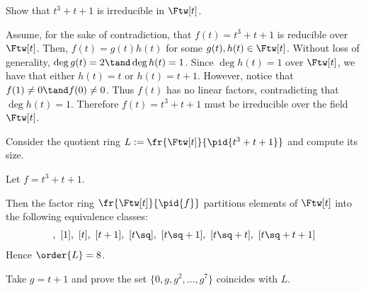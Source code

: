 \documentclass{article}
\begin{document}

\setcounter{section}{3}
\setcounter{exercise}{1}
\begin{subexercise}
Show that \( t^3+t+1 \) is irreducible in \( \Ftw[t] \).
\end{subexercise}

\begin{solution}
Assume, for the sake of contradiction, that \( f(t) = t^3+t+1 \) is reducible over \( \Ftw[t] \).
Then, \( f(t) = g(t)h(t) \) for some \( g(t),h(t)\in \Ftw[t] \).
Without loss of generality, \( \deg g(t) = 2 \tand \deg h(t) = 1 \).
Since \( \deg h(t) = 1 \) over \( \Ftw[t] \), we have that either \( h(t) = t \) or \( h(t) = t+1 \).
However, notice that \( f(1) \neq 0\tand f(0)\neq 0 \).
Thus \( f(t) \) has no linear factors, contradicting that \( \deg h(t) = 1 \).
Therefore \( f(t) = t^3+t+1 \) must be irreducible over the field \( \Ftw[t] \).
\end{solution}

\begin{subexercise}
Consider the quotient ring \( L:= \fr{\Ftw[t]}{\pid{t^3+t+1}} \) and compute its size.
\end{subexercise}

\begin{solution}
Let \( f = t^3+t+1 \).

Then the factor ring \( \fr{\Ftw[t]}{\pid{f}} \) partitions elements of \( \Ftw[t] \) into the following equivalence classes: \begin{align*}
  [0],\ [1],\ [t] ,\ [t+1],\ [t\sq],\ [t\sq+1],\ [t\sq+t],\ [t\sq+t+1]
\end{align*}
Hence \( \order{L} = 8 \).
\end{solution}

\begin{subexercise}
Take \( g=t+1 \) and prove the set \( \{0,g,g^2,\ldots,g^7\} \) coincides with \( L \).
\end{subexercise}
\end{document}

